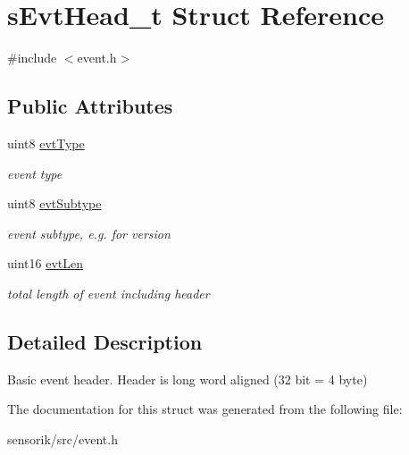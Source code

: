 \hypertarget{structs_evt_head__t}{}\section{s\+Evt\+Head\+\_\+t Struct Reference}
\label{structs_evt_head__t}


{\ttfamily \#include $<$event.\+h$>$}

\subsection*{Public Attributes}
\begin{DoxyCompactItemize}
\item 
\mbox{\label{structs_evt_head__t_a2981e9e912b7939d342bb989a46e8aa7}} 
uint8 \mbox{\hyperlink{structs_evt_head__t_a2981e9e912b7939d342bb989a46e8aa7}{evt\+Type}}
\begin{DoxyCompactList}\small\item\em event type \end{DoxyCompactList}\item 
\mbox{\label{structs_evt_head__t_a107c1d9b22ebb1bc5936ca1329f58a9f}} 
uint8 \mbox{\hyperlink{structs_evt_head__t_a107c1d9b22ebb1bc5936ca1329f58a9f}{evt\+Subtype}}
\begin{DoxyCompactList}\small\item\em event subtype, e.\+g. for version \end{DoxyCompactList}\item 
\mbox{\label{structs_evt_head__t_ab3e6656b75a0c1702e56264c017f5916}} 
uint16 \mbox{\hyperlink{structs_evt_head__t_ab3e6656b75a0c1702e56264c017f5916}{evt\+Len}}
\begin{DoxyCompactList}\small\item\em total length of event including header \end{DoxyCompactList}\end{DoxyCompactItemize}


\subsection{Detailed Description}
Basic event header. Header is long word aligned (32 bit = 4 byte) 

The documentation for this struct was generated from the following file\+:\begin{DoxyCompactItemize}
\item 
sensorik/src/event.\+h\end{DoxyCompactItemize}
